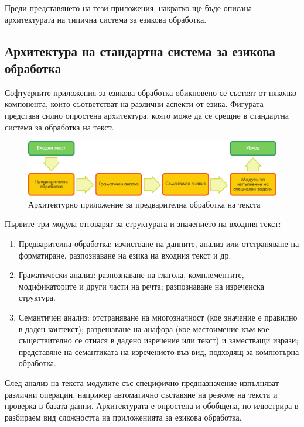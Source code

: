 \documentclass[]{../../metanetpaper}
\begin{document}
\begin{multicols}{2}
Преди представянето на тези приложения, накратко ще бъде описана  архитектурата на типична система за езикова обработка.

\subsection{Архитектура на стандартна система за езикова обработка}

Софтуерните приложения за езикова обработка обикновено се състоят от няколко компонента, които съответстват на различни аспекти от езика. Фигурата представя силно опростена архитектура, която може да се срещне в стандартна система за обработка на текст. 

\begin{figure}[b]
  \center
  \includegraphics[width=\textwidth]{../_media/bulgarian/text_processing_app_architecture}
  \caption{Архитектурно приложение за предварителна обработка на текста}
  \label{fig:textprocessingarch_de}
\end{figure}

Първите три модула отговарят за структурата и значението на входния
текст:

\begin{enumerate}
\item Предварителна обработка: изчистване на данните, анализ или отстраняване на форматиране, разпознаване на езика на входния текст и др. 
\item Граматически анализ: разпознаване на глагола, комплементите, модификаторите и други части на речта; разпознаване на изреченска структура. 
\item Семантичен анализ: отстраняване на многозначност (кое значение е правилно в даден контекст); разрешаване на анафора (кое местоимение към кое съществително се отнася в дадено изречение или текст) и заместващи изрази; представяне на семантиката на изречението във вид, подходящ за компютърна обработка. 
\end{enumerate}

След анализ на текста модулите със специфично предназначение изпълняват различни операции, например автоматично съставяне на резюме на текста и проверка в базата данни. Архитектурата е опростена и обобщена, но илюстрира в разбираем вид сложността на приложенията за езикова обработка. 


\end{multicols}
\end{document}
